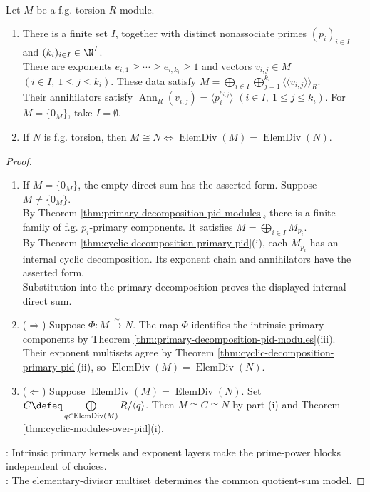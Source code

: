 \begin{theorem} \label{thm:primary-cyclic-decomposition-pid} \\
Let $M$ be a f.g. torsion $R$-module.
\begin{enumerate}[label=(\roman*)]
\setlength{\itemsep}{0pt}
\item There is a finite set $I$, together with distinct nonassociate primes $(p_i)_{i\in I}$ and $(k_i)_{i\in I}\in\N^I$.\\
There are exponents $e_{i,1}\geq\cdots\geq e_{i,k_i}\geq1$ and vectors $v_{i,j}\in M$ $(i\in I,\ 1\leq j\leq k_i)$. These data satisfy $M=\bigoplus\limits_{i\in I}\bigoplus\limits_{j=1}^{k_i}\langle\!\langle v_{i,j}\rangle\!\rangle_R$.\\
Their annihilators satisfy $\operatorname{Ann}_R(v_{i,j})=\langle p_i^{e_{i,j}}\rangle$ $(i\in I,\ 1\leq j\leq k_i)$. For $M=\{0_M\}$, take $I=\emptyset$.
\item If $N$ is f.g. torsion, then $M\cong N\Longleftrightarrow\operatorname{ElemDiv}(M)=\operatorname{ElemDiv}(N)$.
\end{enumerate}
\begin{proof}
\begin{enumerate}[label=(\roman*)]
\setlength{\itemsep}{0pt}
\item[$(i)$] If $M=\{0_M\}$, the empty direct sum has the asserted form. Suppose $M\neq\{0_M\}$.\\
By Theorem \ref{thm:primary-decomposition-pid-modules}, there is a finite family of f.g. $p_i$-primary components. It satisfies $M=\bigoplus\limits_{i\in I}M_{p_i}$.\\
By Theorem \ref{thm:cyclic-decomposition-primary-pid}(i), each $M_{p_i}$ has an internal cyclic decomposition. Its exponent chain and annihilators have the asserted form.\\
Substitution into the primary decomposition proves the displayed internal direct sum.
\item[$(ii)$] ($\Rightarrow$) Suppose $\Phi:M\xrightarrow{\sim}N$. The map $\Phi$ identifies the intrinsic primary components by Theorem \ref{thm:primary-decomposition-pid-modules}(iii).\\
Their exponent multisets agree by Theorem \ref{thm:cyclic-decomposition-primary-pid}(ii), so $\operatorname{ElemDiv}(M)=\operatorname{ElemDiv}(N)$.
\item[$(ii)$] ($\Leftarrow$) Suppose $\operatorname{ElemDiv}(M)=\operatorname{ElemDiv}(N)$. Set $C\defeq\bigoplus\limits_{q\in\operatorname{ElemDiv}(M)}R/\langle q\rangle$. Then $M\cong C\cong N$ by part (i) and Theorem \ref{thm:cyclic-modules-over-pid}(i).
\end{enumerate}
\noindent
{}: Intrinsic primary kernels and exponent layers make the prime-power blocks independent of choices.\\
: The elementary-divisor multiset determines the common quotient-sum model.
\end{proof}
\end{theorem}

